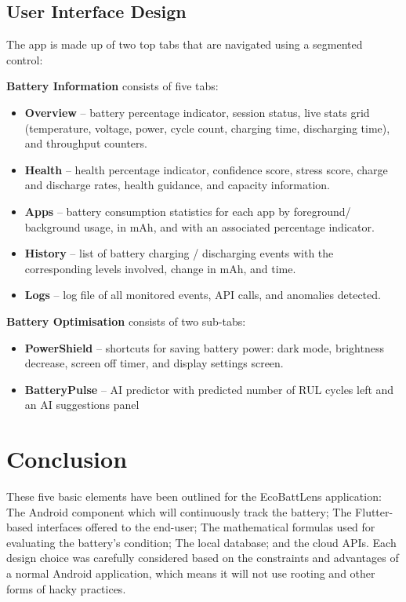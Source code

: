 \documentclass[12pt,a4paper]{report}
\begin{document}
\subsection{User Interface Design}

The app is made up of two top tabs that are navigated using a segmented control:

\textbf{Battery Information} consists of five tabs:
\begin{itemize}
  \item \textbf{Overview} – battery percentage indicator, session status, live
        stats grid (temperature, voltage, power, cycle count, charging time,
        discharging time), and throughput counters.
  \item \textbf{Health} – health percentage indicator, confidence score,
        stress score, charge and discharge rates, health guidance, and
        capacity information.
  \item \textbf{Apps} – battery consumption statistics for each app by
        foreground/ background usage, in mAh, and with an associated
        percentage indicator.
  \item \textbf{History} – list of battery charging / discharging events
        with the corresponding levels involved, change in mAh, and time.
  \item \textbf{Logs} – log file of all monitored events, API calls, and
        anomalies detected.
\end{itemize}

\textbf{Battery Optimisation} consists of two sub-tabs:
\begin{itemize}
  \item \textbf{PowerShield} – shortcuts for saving battery power:
        dark mode, brightness decrease, screen off timer, and display
        settings screen.
  \item \textbf{BatteryPulse} – AI predictor with predicted number of RUL
        cycles left and an AI suggestions panel
\end{itemize}
\section{Conclusion}
These five basic elements have been outlined for the EcoBattLens application: The Android component which will continuously track the battery; The Flutter-based interfaces offered to the end-user; The mathematical formulas used for evaluating the battery's condition; The local database; and the cloud APIs.
Each design choice was carefully considered based on the constraints and advantages of a normal Android application, which means it will not use rooting and other forms of hacky practices.
\end{document}
